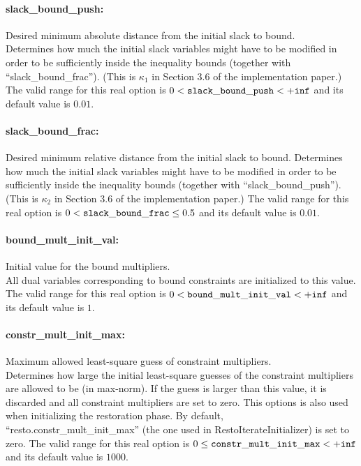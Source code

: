 \paragraph{slack\_bound\_push:} Desired minimum absolute distance from the initial slack to bound. $\;$ \\       Determines how much the initial slack variables might have to be modified
in order to be sufficiently inside the inequality bounds (together with ``slack\_bound\_frac'').
(This is $\kappa_1$ in Section 3.6 of the implementation paper.)
The valid range for this real option is 
$0 <  {\tt slack\_bound\_push } <  {\tt +inf}$
and its default value is $0.01$.

\paragraph{slack\_bound\_frac:} Desired minimum relative distance from the initial slack to bound.
     Determines how much the initial slack variables might have to be modified
     in order to be sufficiently inside the inequality bounds (together with
     ``slack\_bound\_push'').
(This is $\kappa_2$ in Section 3.6 of the implementation paper.)
The valid range for this real option is 
$0 <  {\tt slack\_bound\_frac } \le  0.5$
and its default value is $0.01$.


\paragraph{bound\_mult\_init\_val:} Initial value for the bound multipliers. $\;$ \\
 All dual variables corresponding to bound
constraints are initialized to this value. The valid range for this real option is 
$0 <  {\tt bound\_mult\_init\_val } <  {\tt +inf}$
and its default value is $1$.


\paragraph{constr\_mult\_init\_max:} Maximum allowed least-square guess of constraint multipliers. $\;$ \\
 Determines how large the initial least-square
guesses of the constraint multipliers are allowed
to be (in max-norm). If the guess is larger than
this value, it is discarded and all constraint
multipliers are set to zero.  This options is
also used when initializing the restoration
phase. By default,
``resto.constr\_mult\_init\_max'' (the one used in
RestoIterateInitializer) is set to zero. The valid range for this real option is 
$0 \le {\tt constr\_mult\_init\_max } <  {\tt +inf}$
and its default value is $1000$.


